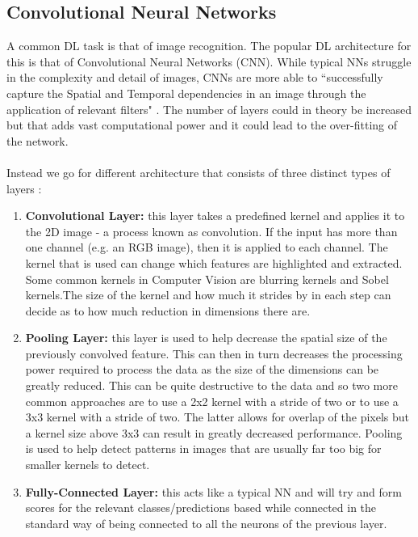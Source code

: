\subsection{Convolutional Neural Networks}
A common DL task is that of image recognition. The popular DL architecture for this is that of Convolutional Neural Networks (CNN). 
While typical NNs struggle in the complexity and detail of images, CNNs are more able to ``successfully capture the Spatial and Temporal dependencies in an image through the application of relevant filters" \cite{eli5_convnet}. 
The number of layers could in theory be increased but that adds vast computational power and it could lead to the over-fitting of the network. \\ \\
Instead we go for different architecture that consists of three distinct types of layers \cite{convnet}:
\begin{enumerate}
    \item \textbf{Convolutional Layer:} this layer takes a predefined kernel \cite{kernel} and applies it to the 2D image - a process known as convolution. 
    If the input has more than one channel (e.g. an RGB image), then it is applied to each channel. 
    The kernel that is used can change which features are highlighted and extracted. 
    Some common kernels in Computer Vision are blurring kernels and Sobel kernels.The size of the kernel and how much it strides by in each step can decide as to how much reduction in dimensions there are.
    
    \item \textbf{Pooling Layer:} this layer is used to help decrease the spatial size of the previously convolved feature. 
    This can then in turn decreases the processing power required to process the data as the size of the dimensions can be greatly reduced. 
    This can be quite destructive to the data and so two more common approaches are to use a 2x2 kernel with a stride of two or to use a 3x3 kernel with a stride of two. 
    The latter allows for overlap of the pixels but a kernel size above 3x3 can result in greatly decreased performance. 
    Pooling is used to help detect patterns in images that are usually far too big for smaller kernels to detect.
    
    \item \textbf{Fully-Connected Layer:} this acts like a typical NN and will try and form scores for the relevant classes/predictions based while connected in the standard way of being connected to all the neurons of the previous layer.
\end{enumerate}
